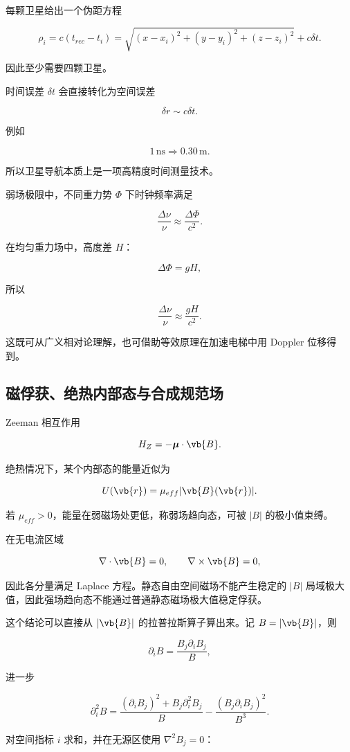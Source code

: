 每颗卫星给出一个伪距方程

\[
\rho_i
=c(t_{rec}-t_i)
=\sqrt{(x-x_i)^2+(y-y_i)^2+(z-z_i)^2}+c\delta t.
\]

因此至少需要四颗卫星。

时间误差 \(\delta t\) 会直接转化为空间误差

\[
\delta r\sim c\delta t.
\]

例如

\[
1\,\text{ns}\Rightarrow 0.30\,\text{m}.
\]

所以卫星导航本质上是一项高精度时间测量技术。

弱场极限中，不同重力势 \(\Phi\) 下时钟频率满足

\[
\frac{\Delta\nu}{\nu}
\approx\frac{\Delta\Phi}{c^2}.
\]

在均匀重力场中，高度差 \(H\)：

\[
\Delta\Phi=gH,
\]

所以

\[
\frac{\Delta\nu}{\nu}\approx\frac{gH}{c^2}
.
\]

这既可从广义相对论理解，也可借助等效原理在加速电梯中用 Doppler 位移得到。

\subsection{磁俘获、绝热内部态与合成规范场}
Zeeman 相互作用

\[
H_Z=-\boldsymbol\mu\cdot\vb{B}.
\]

绝热情况下，某个内部态的能量近似为

\[
U(\vb{r})=\mu_{eff}|\vb{B}(\vb{r})|.
\]

若 \(\mu_{eff}>0\)，能量在弱磁场处更低，称弱场趋向态，可被 \(|B|\) 的极小值束缚。

在无电流区域

\[
\nabla\cdot\vb{B}=0,
\qquad
\nabla\times\vb{B}=0,
\]

因此各分量满足 Laplace 方程。静态自由空间磁场不能产生稳定的 \(|B|\) 局域极大值，因此强场趋向态不能通过普通静态磁场极大值稳定俘获。

这个结论可以直接从 \(|\vb{B}|\) 的拉普拉斯算子算出来。记 \(B=|\vb{B}|\)，则

\[
\partial_iB=\frac{B_j\partial_iB_j}{B},
\]

进一步

\[
\partial_i^2B
=\frac{(\partial_iB_j)^2+B_j\partial_i^2B_j}{B}
-\frac{(B_j\partial_iB_j)^2}{B^3}.
\]

对空间指标 \(i\) 求和，并在无源区使用 \(\nabla^2B_j=0\)：

